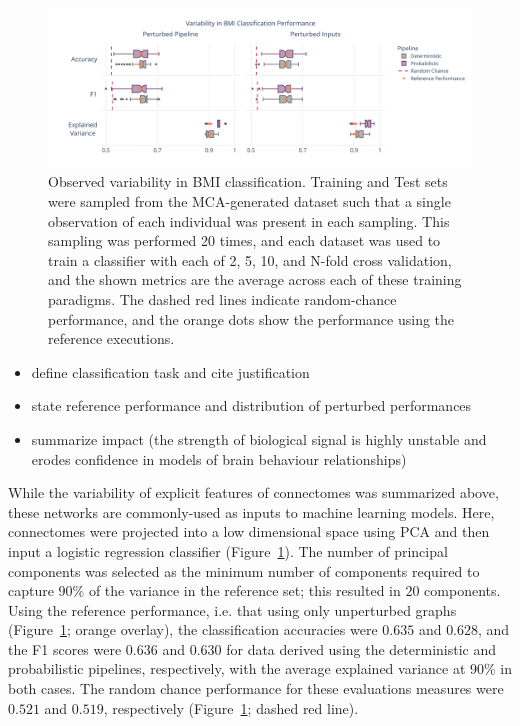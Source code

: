 \documentclass[fleqn,10pt]{SelfArx} %
\begin{document}
\begin{figure}[ht]\centering
\includegraphics[width=\linewidth]{figures/fig3_bmi_classification.pdf}
\caption{Observed variability in BMI classification. Training and Test sets were sampled from the MCA-generated dataset
such that a single observation of each individual was present in each sampling. This sampling was performed 20 times,
and each dataset was used to train a classifier with each of 2, 5, 10, and N-fold cross validation, and the shown
metrics are the average across each of these training paradigms. The dashed red lines indicate random-chance
performance, and the orange dots show the performance using the reference executions.}
\label{fig:bmi}
\end{figure}

\begin{itemize}
\item define classification task and cite justification
\item state reference performance and distribution of perturbed performances
\item summarize impact (the strength of biological signal is highly unstable and erodes confidence in models of brain
behaviour relationships)
\end{itemize}

While the variability of explicit features of connectomes was summarized above, these networks are commonly-used as
inputs to machine learning models. Here, connectomes were projected into a low dimensional space using PCA and then
input a logistic regression classifier (Figure~\ref{fig:bmi}). The number of principal components was selected as the
minimum number of components required to capture 90\% of the variance in the reference set; this resulted in $20$
components. Using the reference performance, i.e. that using only unperturbed graphs (Figure~\ref{fig:bmi}; orange
overlay), the classification accuracies were $0.635$ and $0.628$, and the F1 scores were $0.636$ and $0.630$ for data
derived using the deterministic and probabilistic pipelines, respectively, with the average explained variance at 90\%
in both cases. The random chance performance for these evaluations measures were $0.521$ and $0.519$, respectively
(Figure~\ref{fig:bmi}; dashed red line).
\end{document}
